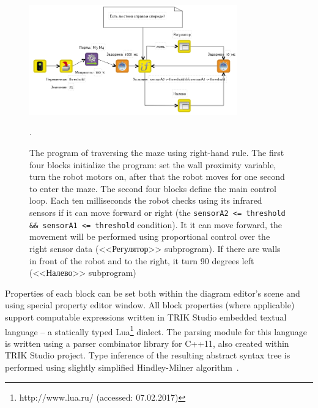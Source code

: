 \documentclass[conference]{IEEEtran}
\begin{document}
\begin{figure}[ht]
    \centering
    \includegraphics[width=0.8\textwidth]{TS_CF_Labyrinth_Diagram.png}
    \caption{The program of traversing the maze using right-hand rule. The first four blocks initialize the program: set the wall proximity variable, turn the robot motors on, after that the robot moves for one second to enter the maze. The second four blocks define the main control loop. Each ten milliseconds the robot checks using its infrared sensors if it can move forward or right (the \texttt{sensorA2 <= threshold \&\& sensorA1 <= threshold} condition). It it can move forward, the movement will be performed using proportional control over the right sensor data (<<Регулятор>> subprogram). If there are walls in front of the robot and to the right, it turn 90 degrees left (<<Налево>> subprogram)}.
    \label{image:TS_CF_Example}
\end{figure}

Properties of each block can be set both within the diagram editor's scene and using special property editor window. All block properties (where applicable) support computable expressions written in TRIK Studio embedded textual language -- a statically typed Lua\footnote{http://www.lua.ru/ (accessed: 07.02.2017)} dialect. The parsing module for this language is written using a parser combinator library for C++11, also created within TRIK Studio project. Type inference of the resulting abstract syntax tree is performed using slightly simplified Hindley-Milner algorithm~\cite{damas1982principal}.
\end{document}
